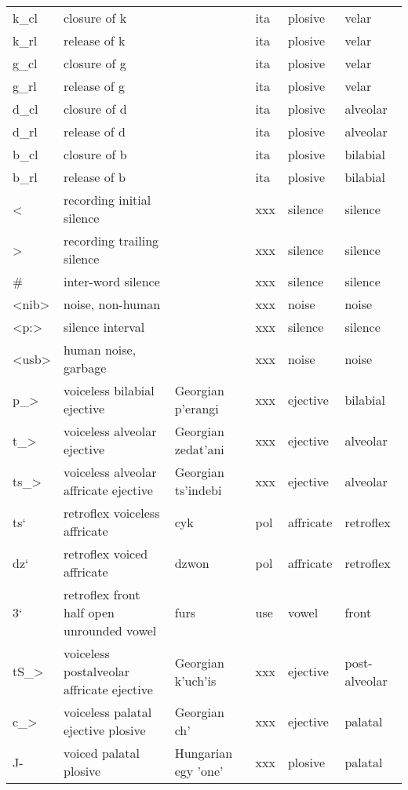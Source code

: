 {\begin{longtable}{l|p{.3\linewidth}|p{.15\linewidth}|l|p{.15\linewidth}|l}
	k\_cl	& closure of k	& 	& ita	& plosive	& velar	\\
	k\_rl	& release of k	& 	& ita	& plosive	& velar	\\
	g\_cl	& closure of g	& 	& ita	& plosive	& velar	\\
	g\_rl	& release of g	& 	& ita	& plosive	& velar	\\
	d\_cl	& closure of d	& 	& ita	& plosive	& alveolar	\\
	d\_rl	& release of d	& 	& ita	& plosive	& alveolar	\\
	b\_cl	& closure of b	& 	& ita	& plosive	& bilabial	\\
	b\_rl	& release of b	& 	& ita	& plosive	& bilabial	\\
	\textless	& recording initial silence	& 	& xxx	& silence	& silence	\\
	\textgreater	& recording trailing silence	& 	& xxx	& silence	& silence	\\
	\#	& inter-word silence	& 	& xxx	& silence	& silence	\\
	\textless nib\textgreater	& noise, non-human	& 	& xxx	& noise	& noise	\\
	\textless p:\textgreater	& silence interval	& 	& xxx	& silence	& silence	\\
	\textless usb\textgreater	& human noise, garbage	& 	& xxx	& noise	& noise	\\
	p\_\textgreater	& voiceless bilabial ejective	& Georgian p'erangi	& xxx	& ejective	& bilabial\\	
	t\_\textgreater	& voiceless alveolar ejective	& Georgian zedat'ani	& xxx	& ejective	& alveolar\\
	ts\_\textgreater	& voiceless alveolar affricate ejective	& Georgian ts'indebi	& xxx	& ejective	& alveolar	\\
	ts`	& retroflex voiceless affricate	& cyk	& pol	& affricate	& retroflex	\\
	dz`	& retroflex voiced affricate	& dzwon	& pol	& affricate	& retroflex	\\
	3`	& retroflex front half open unrounded vowel	& furs	& use	& vowel	& front	\\
	tS\_\textgreater	& voiceless postalveolar affricate ejective	& Georgian k'uch'is	& xxx	& ejective	& post-alveolar	\\
	c\_\textgreater	& voiceless palatal ejective plosive	& Georgian ch' & xxx	& ejective	& palatal	\\
	J-	& voiced palatal plosive	& Hungarian egy 'one'	& xxx	& plosive	& palatal	\\

\end{longtable}}
